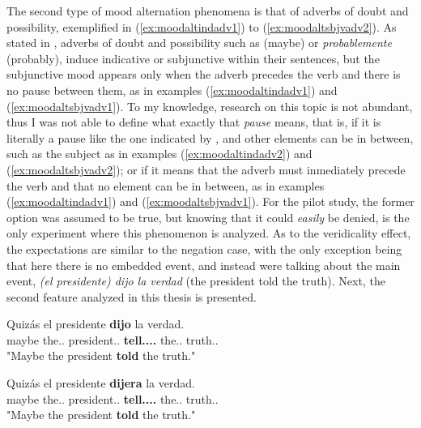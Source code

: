 The second type of mood alternation phenomena is that of adverbs of doubt and possibility, exemplified in (\ref{ex:moodaltindadv1}) to (\ref{ex:moodaltsbjvadv2}). As stated in \citet{espanola2010nueva}, adverbs of doubt and possibility such as  (maybe) or \textit{probablemente} (probably), induce indicative or subjunctive within their sentences, but the subjunctive mood appears only when the adverb precedes the verb and there is no pause between them, as in examples (\ref{ex:moodaltindadv1}) and (\ref{ex:moodaltsbjvadv1}). To my knowledge, research on this topic is not abundant, thus I was not able to define what exactly that \textit{pause} means, that is, if it is literally a pause like the one indicated by \textit{,} and other elements can be in between, such as the subject as in examples (\ref{ex:moodaltindadv2}) and (\ref{ex:moodaltsbjvadv2}); or if it means that the adverb must inmediately precede the verb and that no element can be in between, as in examples (\ref{ex:moodaltindadv1}) and (\ref{ex:moodaltsbjvadv1}). For the pilot study, the former option was assumed to be true, but knowing that it could \textit{easily} be denied, is the only experiment where this phenomenon is analyzed. As to the veridicality effect, the expectations are similar to the negation case, with the only exception being that here there is no embedded event, and instead were talking about the main event, \textit{(el presidente) dijo la verdad} (the president told the truth). Next, the second feature analyzed in this thesis is presented.\\

\begin{exe}
  \ex
    \begin{xlist}
      \item{\gll Quizás el presidente \textbf{dijo} la verdad.\\ maybe the.\M.\Sg{} president.\M.\Sg{} \textbf{tell.\Pst.\Pfv.\Ind.\Tsg{}} the.\F.\Sg{} truth.\F.\Sg{} \\ "Maybe the president \textbf{told} the truth."}\label{ex:moodaltindadv2}
      \item{\gll Quizás el presidente \textbf{dijera} la verdad.\\ maybe the.\M.\Sg{} president.\M.\Sg{} \textbf{tell.\Pst.\Pfv.\Sbjv.\Tsg{}} the.\F.\Sg{} truth.\F.\Sg{} \\ "Maybe the president \textbf{told} the truth."}\label{ex:moodaltsbjvadv2}
    \end{xlist}
\end{exe}

